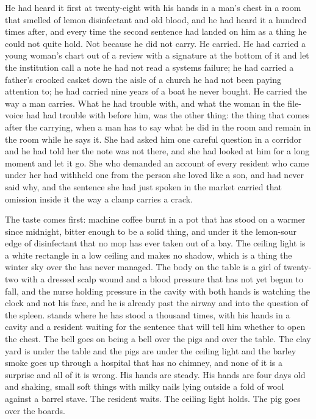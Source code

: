 He had heard it first at twenty-eight with his hands in a man's chest in a room that smelled of lemon disinfectant and old blood, and he had heard it a hundred times after, and every time the second sentence had landed on him as a thing he could not quite hold. Not because he did not carry. He carried. He had carried a young woman's chart out of a review with a signature at the bottom of it and let the institution call a note he had not read a systems failure; he had carried a father's crooked casket down the aisle of a church he had not been paying attention to; he had carried nine years of a boat he never bought. He carried the way a man carries. What he had trouble with, and what the woman in the file-voice had had trouble with before him, was the other thing: the thing that comes after the carrying, when a man has to say what he did in the room and remain in the room while he says it. She had asked him one careful question in a corridor and he had told her the note was not there, and she had looked at him for a long moment and let it go. She who demanded an account of every resident who came under her had withheld one from the person she loved like a son, and had never said why, and the sentence she had just spoken in the market carried that omission inside it the way a clamp carries a crack.

\scenebreak

The taste comes first: machine coffee burnt in a pot that has stood on a warmer since midnight, bitter enough to be a solid thing, and under it the lemon-sour edge of disinfectant that no mop has ever taken out of a bay. The ceiling light is a white rectangle in a low ceiling and makes no shadow, which is a thing the winter sky over the  has never managed. The body on the table is a girl of twenty-two with a dressed scalp wound and a blood pressure that has not yet begun to fall, and the nurse holding pressure in the cavity with both hands is watching the clock and not his face, and he is already past the airway and into the question of the spleen.  stands where he has stood a thousand times, with his hands in a cavity and a resident waiting for the sentence that will tell him whether to open the chest. The bell goes on being a bell over the pigs and over the table. The clay yard is under the table and the pigs are under the ceiling light and the barley smoke goes up through a hospital that has no chimney, and none of it is a surprise and all of it is wrong. His hands are steady. His hands are four days old and shaking, small soft things with milky nails lying outside a fold of wool against a barrel stave. The resident waits. The ceiling light holds. The pig goes over the boards.

